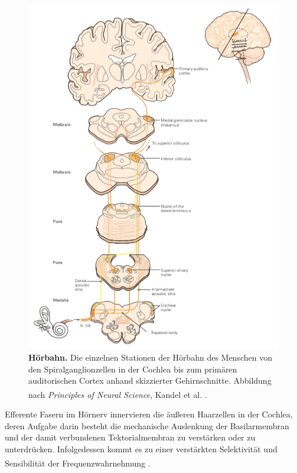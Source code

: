 \documentclass[12pt,a4paper,pdftex]{article}
\begin{document}
\begin{figure}[H]
    \centering
    \includegraphics{pictures/auditory/hoerbahn_pathway.png}
    \caption[Hörbahn]{\textbf{Hörbahn.} Die einzelnen Stationen der Hörbahn des Menschen von den Spiralganglionzellen in der Cochlea bis zum primären auditorischen Cortex anhand skizzierter Gehirnschnitte. Abbildung nach \textit{Principles of Neural Science}, Kandel et al. \textsuperscript{\cite[30]{kandel2013principles}}.}
    \label{fig:hoerbahn_pathway}
\end{figure}

\newpage
\noindent Efferente Fasern im Hörnerv innervieren die äußeren Haarzellen  in der Cochlea, deren Aufgabe darin besteht die mechanische Auslenkung der Basilarmembran und der damit verbundenen Tektorialmembran  zu verstärken oder zu unterdrücken. Infolgedessen kommt es zu einer verstärkten Selektivität und Sensibilität der Frequenzwahrnehmung \textsuperscript{\cite[22]{paxinos2014rat}}.
\end{document}
